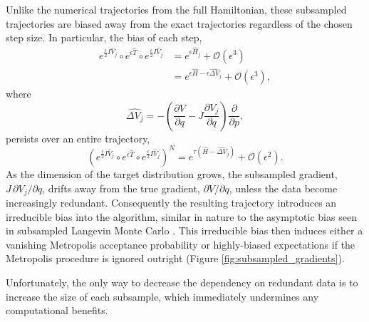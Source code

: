 \documentclass{article}
\begin{document}
Unlike the numerical trajectories from the full Hamiltonian, these subsampled 
trajectories are biased away from the exact trajectories regardless of the chosen step size.  
In particular, the bias of each step,
%
\begin{align*}
e^{\frac{\epsilon}{2} I \hat{V}_{j} } \circ 
e^{\epsilon \hat{T} } \circ 
e^{\frac{\epsilon}{2} I \hat{V}_{j} }
&=
e^{ \epsilon \hat{H}_{j} }
+ \mathcal{O} \! \left( \epsilon^{3} \right)
\\
&=
e^{ \epsilon \hat{H} - \epsilon \widehat{ \Delta V}_{j} }
+ \mathcal{O} \! \left( \epsilon^{3} \right),
\end{align*}
%
where
%
\begin{equation} \label{eqn:between_bias}
\widehat{ \Delta V_{j} } = 
- \left( \frac{ \partial V }{ \partial q } - J \frac{ \partial V_{j} }{ \partial q } \right)
\frac{ \partial }{ \partial p },
\end{equation}
%
persists over an entire trajectory,
%
\begin{equation*}
\left( e^{\frac{\epsilon}{2} I \hat{V}_{j} } \circ 
e^{\epsilon \hat{T} } \circ 
e^{\frac{\epsilon}{2} I \hat{V}_{j} } \right)^{N}
=
e^{ \tau \left( \hat{H} - \widehat{ \Delta V}_{j} \right) }
+ \mathcal{O} \! \left( \epsilon^{2} \right).
\end{equation*}
%
As the dimension of the target distribution grows, the subsampled gradient,
$J \, \partial V_{j} / \partial q $, drifts away from the true gradient, 
$\partial V / \partial q $, unless the data become increasingly redundant.
Consequently the resulting trajectory introduces an irreducible bias into
the algorithm, similar in nature to the asymptotic bias seen in subsampled
Langevin Monte Carlo \cite{TehEtAl:2014, VollmerEtAl:2015}.  This
irreducible bias then induces either a vanishing Metropolis acceptance probability 
or highly-biased expectations if the Metropolis procedure is ignored outright 
(Figure \ref{fig:subsampled_gradients}).  

Unfortunately, the only way to decrease the dependency on redundant data
is to increase the size of each subsample, which immediately undermines
any computational benefits.
\end{document}
